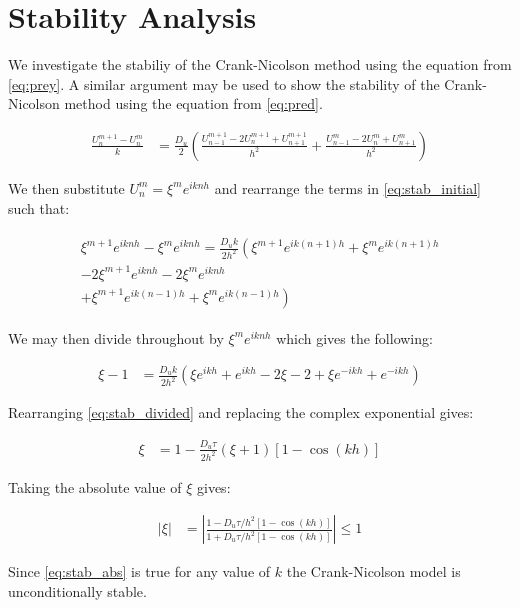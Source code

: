\section{Stability Analysis}

We investigate the stabiliy of the Crank-Nicolson method using the equation
from \eqref{eq:prey}. A similar argument may be used to show the stability of
the Crank-Nicolson method using the equation from \eqref{eq:pred}.

\begin{align} \label{eq:stab_initial}
\frac{U_n^{m+1} - U_n^m}{k} &=
    \frac{D_u}{2} \left(
        \frac{U_{n-1}^{m+1} - 2 U_{n}^{m+1} + U_{n+1}^{m+1}}{h^2} +
        \frac{U_{n-1}^{m} - 2 U_{n}^{m} + U_{n+1}^{m}}{h^2}
    \right)
\end{align}

We then substitute $U_n^m = \xi^m e^{iknh}$ and rearrange the terms in
\eqref{eq:stab_initial} such that:

\begin{align} \label{eq:stab_subbed}
\begin{split}
\xi^{m+1} e^{iknh} - \xi^{m} e^{iknh} =
    \frac{D_u k}{2h^2} \left(
        \xi^{m+1} e^{ik(n+1)h} + \xi^{m} e^{ik(n+1)h} \right. \\
        - 2 \xi^{m+1} e^{iknh} - 2 \xi^{m} e^{iknh} \\
        \left. + \xi^{m+1} e^{ik(n-1)h} + \xi^{m} e^{ik(n-1)h} \right)
\end{split}
\end{align}

We may then divide throughout by $\xi^{m} e^{iknh}$ which gives the following:

\begin{align} \label{eq:stab_divided}
\xi - 1 &= \frac{D_u k}{2h^2} \left(
    \xi e^{ikh} + e^{ikh} - 2 \xi - 2 + \xi e^{-ikh} + e^{-ikh}
    \right)
\end{align}

Rearranging \eqref{eq:stab_divided} and replacing the complex exponential gives:

\begin{align} \label{eq:stab_trig}
\xi &= 1  - \frac{D_u \tau}{2h^2} (\xi + 1) [1 - \cos(kh)]
\end{align}

Taking the absolute value of $\xi$ gives:

\begin{align} \label{eq:stab_abs}
| \xi | &= \left|
    \frac{1 - D_u \tau / h^2 [1 - \cos(kh)]}
         {1 + D_u \tau / h^2 [1 - \cos(kh)]}
    \right| \leq 1
\end{align}

Since \eqref{eq:stab_abs} is true for any value of $k$ the Crank-Nicolson model
is unconditionally stable.
